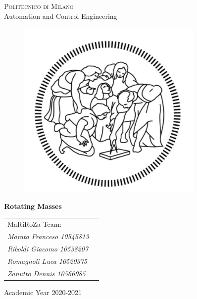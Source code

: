 \documentclass{report}
\begin{document}
	
	
	\thispagestyle{empty}
	\enlargethispage{60mm}
	\begin{center}
		\Large{\textsc{Politecnico di Milano}}\\
		
		\large{Automation and Control Engineering}\\
		\vspace{7mm}
		\begin{figure}[h]
			\begin{center}
				\includegraphics[scale=1]{polimi_logo}
			\end{center}
		\end{figure}
		\vspace{10mm}
		
		\begin{LARGE}
			\bf Rotating Masses
		\end{LARGE}
		\vspace{60mm}
		
		\begin{flushleft}
			\begin{tabular}{l l }
				MaRiRoZa Team: \\
				\textit{Marata Franceso 10545813} \\
				\textit{Riboldi Giacomo 10538207} \\
				\textit{Romagnoli Luca 10520375} \\
				\textit{Zanutto Dennis 10566985} \\
			\end{tabular}
		\end{flushleft}
		\vspace{15mm}
		
		
		\vspace{43mm}
		{\large{Academic Year 2020-2021}}
	\end{center}
	
\end{document}
